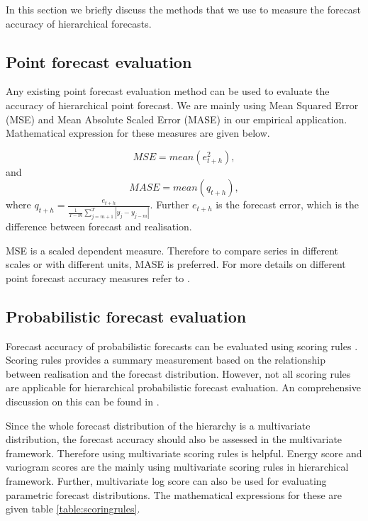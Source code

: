 \documentclass[graybox]{svmult}
\begin{document}
In this section we briefly discuss the methods that we use to measure the forecast accuracy of hierarchical forecasts.

\subsection{Point forecast evaluation}

Any existing point forecast evaluation method can be used to evaluate the accuracy of hierarchical point forecast. We are mainly using Mean Squared Error (MSE) and Mean Absolute Scaled Error (MASE) in our empirical application. Mathematical expression for these measures are given below.

\begin{equation}\label{eq:22}
MSE = mean(e^2_{t+h}),
\end{equation}
and
\begin{equation}\label{eq:23}
 MASE = mean(q_{t+h}),
\end{equation}
where $q_{t+h} = \frac{e_{t+h}}{\frac{1}{T-m}\sum_{j=m+1}^{T}|y_j - y_{j-m}|}$. Further $e_{t+h}$ is the forecast error, which is the difference between forecast and realisation.

MSE is a scaled dependent measure. Therefore to compare series in different scales or with different units, MASE is preferred. For more details on different point forecast accuracy measures refer to \cite{hyndman2018forecasting}.

\subsection{Probabilistic forecast evaluation}

Forecast accuracy of probabilistic forecasts can be evaluated using scoring rules \cite{Gneiting2014}. Scoring rules provides a summary measurement based on the relationship between realisation and the forecast distribution. However, not all scoring rules are applicable for hierarchical probabilistic forecast evaluation. An comprehensive discussion on this can be found in \cite{Gamakumara2018}.

Since the whole forecast distribution of the hierarchy is a multivariate distribution, the forecast accuracy should also be assessed in the multivariate framework. Therefore using multivariate scoring rules is helpful. Energy score \citep{Gneiting2008} and variogram scores \citep{SCHEUERER2015} are the mainly using multivariate scoring rules in hierarchical framework. Further, multivariate log score \citep{Gneiting2007} can also be used for evaluating parametric forecast distributions. The mathematical expressions for these are given table \ref{table:scoringrules}.
\end{document}

